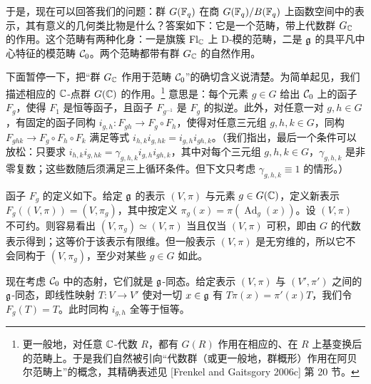 于是，现在可以回答我们的问题：群 $G(\mathbb{F}_q)$ 在商 $G(\mathbb{F}_q)/B(\mathbb{F}_q)$ 上函数空间中的表示，其有意义的几何类比物是什么？答案如下：它是一个范畴，带上代数群 $G_{\mathbb{C}}$ 的作用。这个范畴有两种化身：一是旗簇 $\operatorname{Fl}_{\mathbb{C}}$ 上 D-模的范畴，二是 $\mathfrak{g}$ 的具平凡中心特征的模范畴 $\mathcal{C}_0$。两个范畴都带有群 $G_{\mathbb{C}}$ 的自然作用。

下面暂停一下，把“群 $G_{\mathbb{C}}$ 作用于范畴 $\mathcal{C}_0$”的确切含义说清楚。为简单起见，我们描述相应的 $\mathbb{C}$-点群 $G(\mathbb{C})$ 的作用。\footnote{更一般地，对任意 $\mathbb{C}$-代数 $R$，都有 $G(R)$ 作用在相应的、在 $R$ 上基变换后的范畴上。于是我们自然被引向“代数群（或更一般地，群概形）作用在阿贝尔范畴上”的概念，其精确表述见 [Frenkel and Gaitsgory 2006c] 第 20 节。} 意思是：每个元素 $g\in G$ 给出 $\mathcal{C}_0$ 上的函子 $F_g$，使得 $F_1$ 是恒等函子，且函子 $F_{g^{-1}}$ 是 $F_g$ 的拟逆。此外，对任意一对 $g,h\in G$，有固定的函子同构 $i_{g,h}:F_{gh}\to F_g\circ F_h$，使得对任意三元组 $g,h,k\in G$，同构 $F_{ghk}\to F_g\circ F_h\circ F_k$ 满足等式 $i_{h,k}i_{g,hk}=i_{g,h}i_{gh,k}$。（我们指出，最后一个条件可以放松：只要求 $i_{h,k}i_{g,hk}=\gamma_{g,h,k}i_{g,h}i_{gh,k}$，其中对每个三元组 $g,h,k\in G$，$\gamma_{g,h,k}$ 是非零复数；这些数随后须满足三上循环条件。但下文只考虑 $\gamma_{g,h,k}\equiv 1$ 的情形。）

函子 $F_g$ 的定义如下。给定 $\mathfrak{g}$ 的表示 $(V,\pi)$ 与元素 $g\in G(\mathbb{C})$，定义新表示 $F_g((V,\pi))=(V,\pi_g)$，其中按定义 $\pi_g(x)=\pi(\operatorname{Ad}_g(x))$。设 $(V,\pi)$ 不可约。则容易看出 $(V,\pi_g)\simeq(V,\pi)$ 当且仅当 $(V,\pi)$ 可积，即由 $G$ 的代数表示得到；这等价于该表示有限维。但一般表示 $(V,\pi)$ 是无穷维的，所以它不会同构于 $(V,\pi_g)$，至少对某些 $g\in G$ 如此。

现在考虑 $\mathcal{C}_0$ 中的态射，它们就是 $\mathfrak{g}$-同态。给定表示 $(V,\pi)$ 与 $(V',\pi')$ 之间的 $\mathfrak{g}$-同态，即线性映射 $T:V\to V'$ 使对一切 $x\in\mathfrak{g}$ 有 $T\pi(x)=\pi'(x)T$，我们令 $F_g(T)=T$。此时同构 $i_{g,h}$ 全等于恒等。

